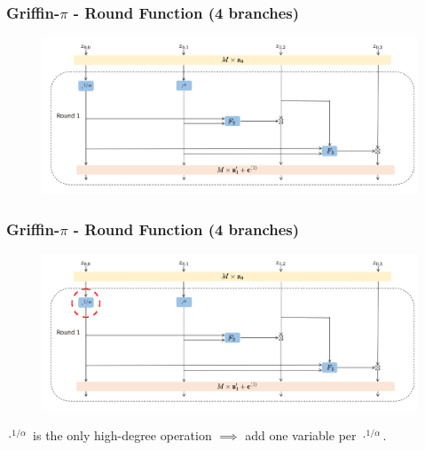 \documentclass[aspectratio=169]{beamer}
\begin{document}
\begin{frame}
  \frametitle{Griffin-$\pi$ - Round Function (4 branches)}
  \begin{figure}
    \centering
    \includegraphics[width=.9\textwidth]{./figures/griffin-round.png}
  \end{figure}

  \vspace{25pt}
  \end{frame}

\begin{frame}
  \frametitle{Griffin-$\pi$ - Round Function (4 branches)}
  \begin{figure}
    \centering
    \includegraphics[width=.9\textwidth]{./figures/griffin-round-inv.png}
  \end{figure}

  \begin{center}
    \textcolor{myred}{$\cdot^{1/\alpha}$ is the only high-degree operation} $\implies$ add one variable per $\cdot^{1/\alpha}$. 
  \end{center}
\end{frame}
\end{document}
